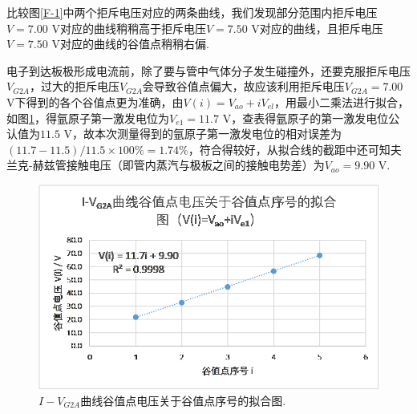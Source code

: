 \documentclass[UTF8,10pt,a4paper]{article}
\begin{document}
比较图\ref{F-1}中两个拒斥电压对应的两条曲线，我们发现部分范围内拒斥电压$V=7.00$ V对应的曲线稍稍高于拒斥电压$V=7.50$ V对应的曲线，且拒斥电压$V=7.50$ V对应的曲线的谷值点稍稍右偏.

电子到达板极形成电流前，除了要与管中气体分子发生碰撞外，还要克服拒斥电压$V_{G2A}$，过大的拒斥电压$V_{G2A}$会导致谷值点偏大，故应该利用拒斥电压$V_{G2A}=7.00$ V下得到的各个谷值点更为准确，由$V(i)=V_{ao}+iV_{el}$，用最小二乘法进行拟合，如图\ref{F-2}，得氩原子第一激发电位为$V_{e1}=11.7$ V，查表得氩原子的第一激发电位公认值为$11.5$ V，故本次测量得到的氩原子第一激发电位的相对误差为$(11.7-11.5)/11.5\times 100\%=1.74\%$，符合得较好，从拟合线的截距中还可知夫兰克-赫兹管接触电压（即管内蒸汽与极板之间的接触电势差）为$V_{ao}=9.90$ V.

\begin{figure}[h]
    \centering
    \includegraphics[width=.8\textwidth]{Vi.png}
    \caption{$I-V_{G2A}$曲线谷值点电压关于谷值点序号的拟合图.}
    \label{F-2}
\end{figure}
\end{document}
